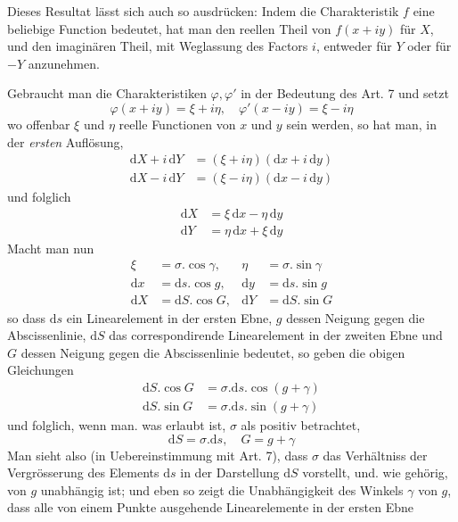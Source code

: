 \par\indent{}%
Dieses Resultat lässt sich auch so ausdrücken: Indem die Charakteristik \(f\) eine beliebige Function bedeutet, hat man den reellen Theil von \(f(x+iy)\) für \(X\), und den imaginären Theil, mit Weglassung des Factors \(i\), entweder für \(Y\) oder für \(-Y\) anzunehmen.

Gebraucht man die Charakteristiken \(\varphi,\varphi'\) in der Bedeutung des Art. 7 und setzt
\[
\varphi(x+iy)=\xi+i\eta,\quad\varphi'(x-iy)=\xi-i\eta
\]
\noindent wo offenbar \(\xi\) und \(\eta\) reelle Functionen von \(x\) und \(y\) sein werden, so hat man, in der \textit{ersten} Auflösung,
\[
\begin{aligned}
\mathrm{d}X+i\,\mathrm{d}Y&=(\xi+i\eta)(\mathrm{d}x+i\,\mathrm{d}y)\\
\mathrm{d}X-i\,\mathrm{d}Y&=(\xi-i\eta)(\mathrm{d}x-i\,\mathrm{d}y)
\end{aligned}
\]
\noindent und folglich
\[
\begin{aligned}
\mathrm{d}X&=\xi\,\mathrm{d}x-\eta\,\mathrm{d}y\\
\mathrm{d}Y&=\eta\,\mathrm{d}x+\xi\,\mathrm{d}y
\end{aligned}
\]
\noindent Macht man nun
\[
\begin{aligned}
\xi&=\sigma\mathord{.}\cos\gamma,&\eta&=\sigma\mathord{.}\sin\gamma\\
\mathrm{d}x&=\mathrm{d}s\mathord{.}\cos g,&\mathrm{d}y&=\mathrm{d}s\mathord{.}\sin g\\
\mathrm{d}X&=\mathrm{d}S\mathord{.}\cos G,&\mathrm{d}Y&=\mathrm{d}S\mathord{.}\sin G
\end{aligned}
\]
\noindent so dass \(\mathrm{d}s\) ein Linearelement in der ersten Ebne, \(g\) dessen Neigung gegen die Abscissenlinie, \(\mathrm{d}S\) das correspondirende Linearelement in der zweiten Ebne und \(G\) dessen Neigung gegen die Abscissenlinie bedeutet, so geben die obigen Gleichungen
\[
\begin{aligned}
\mathrm{d}S\mathord{.}\cos G&=\sigma\mathord{.}\mathrm{d}s\mathord{.}\cos(g+\gamma)\\
\mathrm{d}S\mathord{.}\sin G&=\sigma\mathord{.}\mathrm{d}s\mathord{.}\sin(g+\gamma)
\end{aligned}
\]
\noindent und folglich, wenn man. was erlaubt ist, \(\sigma\) als positiv betrachtet,
\[
\mathrm{d}S=\sigma\mathord{.}\mathrm{d}s,\quad G=g+\gamma
\]
\noindent Man sieht also (in Uebereinstimmung mit Art. 7), dass \(\sigma\) das Verhältniss der Vergrösserung des Elements \(\mathrm{d}s\) in der Darstellung \(\mathrm{d}S\) vorstellt, und. wie gehörig, von \(g\) unabhängig ist; und eben so zeigt die Unabhängigkeit des Winkels \(\gamma\) von \(g\), dass alle von einem Punkte ausgehende Linearelemente in der ersten Ebne
